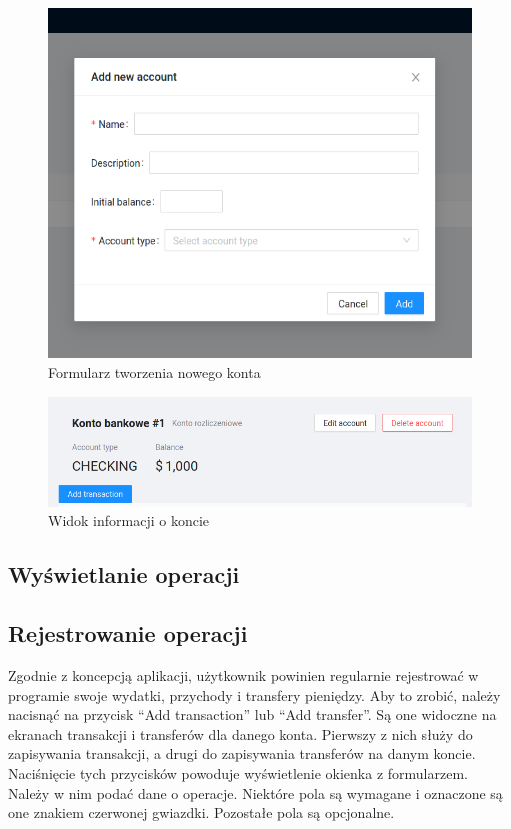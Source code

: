 \documentclass[shortabstract,inz]{iithesis}
\begin{document}
\begin{figure}[h]
	\centering
	\includegraphics[scale=0.7]{screen-new-account.png}
	\caption{Formularz tworzenia nowego konta}
	\label{fig:screen-new-account}
\end{figure}

\begin{figure}[h]
	\centering
	\includegraphics[scale=0.7]{screen-panel-info-konto.png}
	\caption{Widok informacji o koncie}
	\label{fig:screen-account-info}
\end{figure}
\subsection{Wyświetlanie operacji}

\subsection{Rejestrowanie operacji}
Zgodnie z koncepcją aplikacji, użytkownik powinien regularnie rejestrować w programie swoje wydatki, przychody i transfery pieniędzy. Aby to zrobić, należy nacisnąć na przycisk ``Add transaction'' lub ``Add transfer''. Są one widoczne na ekranach transakcji i transferów dla danego konta. Pierwszy z nich służy do zapisywania transakcji, a drugi do zapisywania transferów na danym koncie. Naciśnięcie tych przycisków powoduje wyświetlenie okienka z formularzem. Należy w nim podać dane o operacje. Niektóre pola są wymagane i oznaczone są one znakiem czerwonej gwiazdki. Pozostałe pola są opcjonalne.
\end{document}

